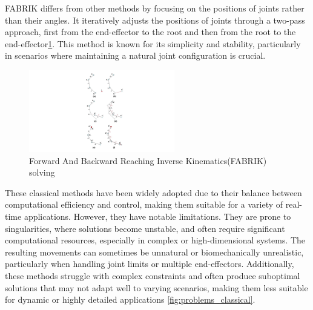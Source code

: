 \documentclass[../../main.tex]{subfiles}
\begin{document}
FABRIK differs from other methods by focusing on the positions of joints rather than their angles. It iteratively adjusts the positions of joints through a two-pass approach, first from the end-effector to the root and then from the root to the end-effector\ref{fig:fabrik}. This method is known for its simplicity and stability, particularly in scenarios where maintaining a natural joint configuration is crucial\cite{TODO}.

\begin{figure}
  \centering \includegraphics[width = 2.5in]{chapters/motion_matching/images/fabrik.png}
  \caption{Forward And Backward Reaching Inverse Kinematics(FABRIK) solving}
  \label{fig:fabrik}
\end{figure}

These classical methods have been widely adopted due to their balance between computational efficiency and control, making them suitable for a variety of real-time applications. However, they have notable limitations. They are prone to singularities, where solutions become unstable, and often require significant computational resources, especially in complex or high-dimensional systems. The resulting movements can sometimes be unnatural or biomechanically unrealistic, particularly when handling joint limits or multiple end-effectors. Additionally, these methods struggle with complex constraints and often produce suboptimal solutions that may not adapt well to varying scenarios, making them less suitable for dynamic or highly detailed applications \ref{fig:problems_classical}.
\end{document}
